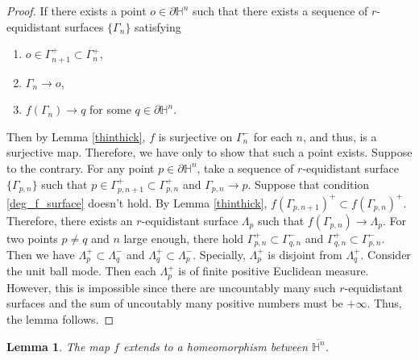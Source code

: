 \documentclass[12pt,reqno,oneside]{amsart}
\theoremstyle{plain}
\newtheorem{Lemma}{Lemma}[section]
\theoremstyle{definition}
\theoremstyle{remark}
\numberwithin{equation}{section}
\renewcommand{\H}{{\mathbb{H}^n}}
\newcommand{\Ga}{{\Gamma}}
\newcommand{\PH}{{\partial \H}}
\renewcommand{\L}{\Lambda}
\newcommand{\thin}[1]{{{#1}}}
\newcommand{\thick}[1]{{{#1}}}
\begin{document}
\begin{proof}
	If there exists a point $o \in \PH$ such that there exists a sequence of
	$r$-equidistant surfaces $\{\Ga_n\}$ satisfying
	\begin{enumerate}
		\item $o \in \thick{\Ga^+_{n+1}} \subset \thick{\Ga^+_n}$,\label{in_thick}
		\item $\Ga_n \to o$,\label{degenerate_surface}
		\item $f(\Ga_n) \to q$ for some $q \in \PH$.\label{deg_f_surface}
	\end{enumerate}
	Then by Lemma \eqref{thinthick}, $f$ is surjective on $\thin{\Ga_n^-}$ for
	each $n$, and thus, is a surjective map.   Therefore, we have only to show that
	such a point exists.  Suppose to the contrary.  For any point $p \in \PH$,
	take a sequence of $r$-equidistant surface $\{\Ga_{p,n}\}$
	such that $p \in \thick{\Ga^+_{p,n+1}}\subset \thick{\Ga^+_{p,n}}$ and
	$\Ga_{p,n} \to p$.  Suppose that condition \eqref{deg_f_surface} doesn't
	hold.  By Lemma \eqref{thinthick}, $\thick{f(\Ga_{p,n+1})^+}\subset
	\thick{f(\Ga_{p,n})^+}$.  Therefore, there exists an $r$-equidistant surface
	$\L_p$ such that $f(\Ga_{p,n}) \to \L_p$.  For two points $p\ne q$ and $n$
	large enough, there hold $\thick{\Ga^+_{p,n}}\subset \thin{\Ga_{q,n}^-}$ and
	$\thick{\Ga^+_{q,n}}\subset \thin{\Ga^-_{p,n}}$.  Then we have $\thick{\L_p^+} \subset
	\thin{\L^-_q}$ and $\thick{\L_q^+} \subset \thin{\L^-_p}$.  Specially,
	$\thick{\L_p^+}$ is disjoint from $\thick{\L_q^+}$.  Consider the unit
	ball mode.  Then each $\thick{\L_p^+}$ is of finite positive Euclidean
	measure.  However, this is impossible since there are uncountably many such
	$r$-equidistant surfaces and the sum of uncoutably many positive numbers must
	be $+\infty$.  Thus, the lemma follows.
\end{proof}
\begin{Lemma}
	The map $f$ extends to a homeomorphism between $\overline{\H}$.
\end{Lemma}
\end{document}
